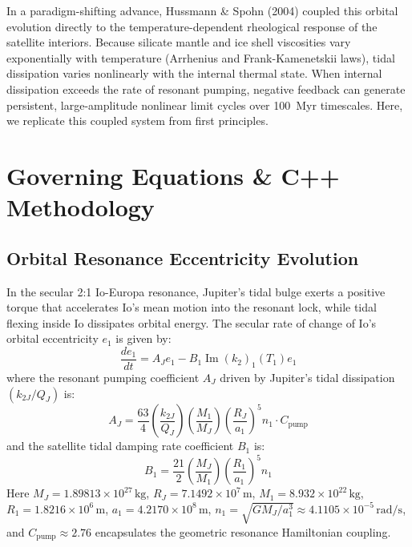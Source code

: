 \documentclass[11pt,a4paper]{article}
\begin{document}
In a paradigm-shifting advance, Hussmann \& Spohn (2004) coupled this orbital evolution directly to the temperature-dependent rheological response of the satellite interiors. Because silicate mantle and ice shell viscosities vary exponentially with temperature (Arrhenius and Frank-Kamenetskii laws), tidal dissipation varies nonlinearly with the internal thermal state. When internal dissipation exceeds the rate of resonant pumping, negative feedback can generate persistent, large-amplitude nonlinear limit cycles over 100~Myr timescales. Here, we replicate this coupled system from first principles.

\section{Governing Equations \& C++ Methodology}

\subsection{Orbital Resonance Eccentricity Evolution}
In the secular 2:1 Io-Europa resonance, Jupiter's tidal bulge exerts a positive torque that accelerates Io's mean motion into the resonant lock, while tidal flexing inside Io dissipates orbital energy. The secular rate of change of Io's orbital eccentricity $e_1$ is given by:
\begin{equation}
\frac{de_1}{dt} = A_J e_1 - B_1 \operatorname{Im}(k_2)_1(T_1) e_1
\label{eq:de_dt}
\end{equation}
where the resonant pumping coefficient $A_J$ driven by Jupiter's tidal dissipation $(k_{2J}/Q_J)$ is:
\begin{equation}
A_J = \frac{63}{4} \left(\frac{k_{2J}}{Q_J}\right) \left(\frac{M_1}{M_J}\right) \left(\frac{R_J}{a_1}\right)^5 n_1 \cdot C_{\mathrm{pump}}
\end{equation}
and the satellite tidal damping rate coefficient $B_1$ is:
\begin{equation}
B_1 = \frac{21}{2} \left(\frac{M_J}{M_1}\right) \left(\frac{R_1}{a_1}\right)^5 n_1
\end{equation}
Here $M_J = 1.89813 \times 10^{27}\,\mathrm{kg}$, $R_J = 7.1492 \times 10^7\,\mathrm{m}$, $M_1 = 8.932 \times 10^{22}\,\mathrm{kg}$, $R_1 = 1.8216 \times 10^6\,\mathrm{m}$, $a_1 = 4.2170 \times 10^8\,\mathrm{m}$, $n_1 = \sqrt{G M_J / a_1^3} \approx 4.1105 \times 10^{-5}\,\mathrm{rad/s}$, and $C_{\mathrm{pump}} \approx 2.76$ encapsulates the geometric resonance Hamiltonian coupling.
\end{document}
